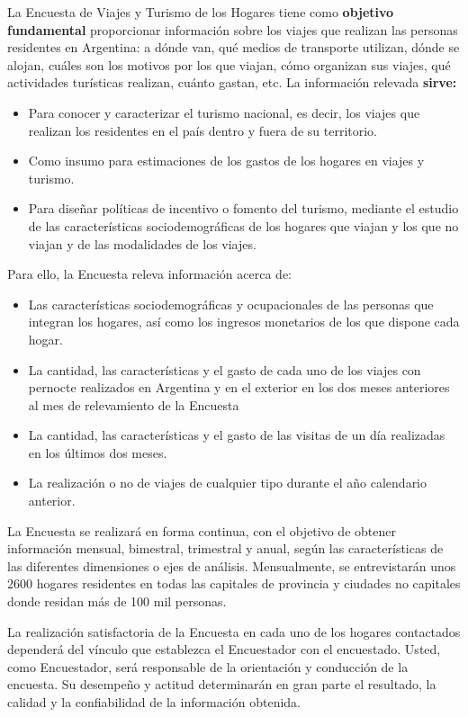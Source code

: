 \documentclass[
  openany]{book}
\begin{document}
La Encuesta de Viajes y Turismo de los Hogares tiene como \textbf{objetivo fundamental} proporcionar información sobre los viajes que realizan las personas residentes en Argentina: a dónde van, qué medios de transporte utilizan, dónde se alojan, cuáles son los motivos por los que viajan, cómo organizan sus viajes, qué actividades turísticas realizan, cuánto gastan, etc. La información relevada \textbf{sirve:}

\begin{itemize}
\item
  Para conocer y caracterizar el turismo nacional, es decir, los viajes que realizan los residentes en el país dentro y fuera de su territorio.
\item
  Como insumo para estimaciones de los gastos de los hogares en viajes y turismo.
\item
  Para diseñar políticas de incentivo o fomento del turismo, mediante el estudio de las características sociodemográficas de los hogares que viajan y los que no viajan y de las modalidades de los viajes.
\end{itemize}

Para ello, la Encuesta releva información acerca de:

\begin{itemize}
\item
  Las características sociodemográficas y ocupacionales de las personas que integran los hogares, así como los ingresos monetarios de los que dispone cada hogar.
\item
  La cantidad, las características y el gasto de cada uno de los viajes con pernocte realizados en Argentina y en el exterior en los dos meses anteriores al mes de relevamiento de la Encuesta
\item
  La cantidad, las características y el gasto de las visitas de un día realizadas en los últimos dos meses.
\item
  La realización o no de viajes de cualquier tipo durante el año calendario anterior.
\end{itemize}

La Encuesta se realizará en forma continua, con el objetivo de obtener información mensual, bimestral, trimestral y anual, según las características de las diferentes dimensiones o ejes de análisis. Mensualmente, se entrevistarán unos 2600 hogares residentes en todas las capitales de provincia y ciudades no capitales donde residan más de 100 mil personas.

La realización satisfactoria de la Encuesta en cada uno de los hogares contactados dependerá del vínculo que establezca el Encuestador con el encuestado. Usted, como Encuestador, será responsable de la orientación y conducción de la encuesta. Su desempeño y actitud determinarán en gran parte el resultado, la calidad y la confiabilidad de la información obtenida.
\end{document}
